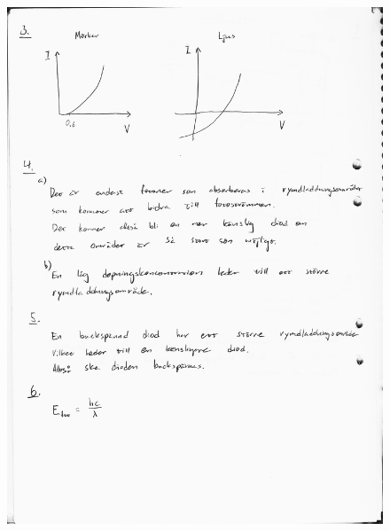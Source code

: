 \documentclass[a4paper]{article}
\begin{document}
\begin{figure}[H]
\centering
\includegraphics[scale=.7]{frb2.jpeg}
\end{figure}
\end{document}

